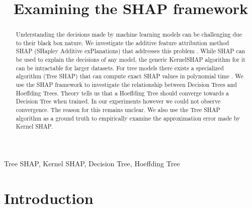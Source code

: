 \documentclass[conference]{IEEEtran}
\begin{document}
\title{Examining the SHAP framework}

\author{
}

\maketitle

\begin{abstract}
Understanding the decisions made by machine learning models can be challenging due to their black box nature.
We investigate the additive feature attribution method SHAP (SHapley Additive exPlanations) that addresses this problem \cite{b2}. 
While SHAP can be used to explain the decisions of any model, the generic KernelSHAP algorithm for it can be intractable for larger datasets. 
For tree models there exists a specialized algorithm (Tree SHAP) that can compute exact SHAP values in polynomial time \cite{b1}. 
We use the SHAP framework to investigate the relationship between Decision Trees and Hoeffding Trees\cite{b3}. 
Theory tells us that a Hoeffding Tree should converge towards a Decision Tree when trained. 
In our experiments however we could not observe convergence. 
The reason for this remains unclear.
We also use the Tree SHAP algorithm as a ground truth to empirically examine the approximation error made by Kernel SHAP.
\end{abstract}

\begin{IEEEkeywords}
Tree SHAP, Kernel SHAP, Decision Tree, Hoeffding Tree
\end{IEEEkeywords}

\section{Introduction}
\end{document}
